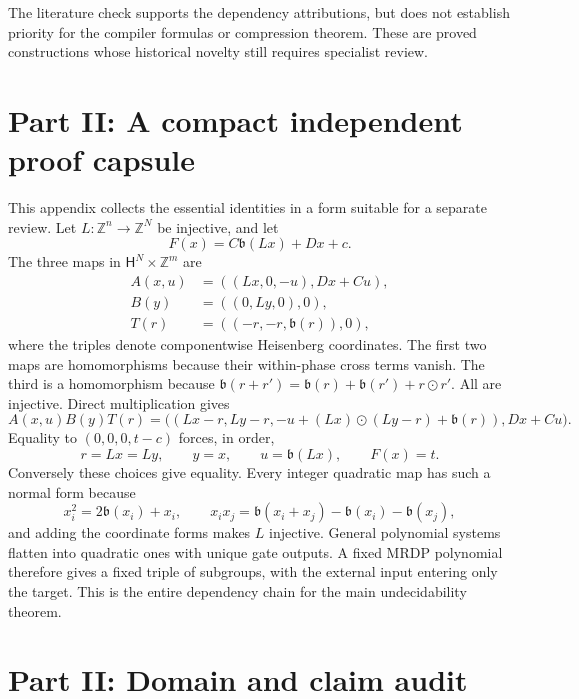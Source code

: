 \documentclass[11pt,letterpaper]{article}
\theoremstyle{definition}
\theoremstyle{remark}
\newcommand{\ZZ}{\mathbb Z}
\newcommand{\HH}{\mathsf H}
\newcommand{\bn}{\mathfrak b}
\begin{document}
The literature check supports the dependency attributions, but does not establish priority for the compiler formulas or compression theorem. These are proved constructions whose historical novelty still requires specialist review.

\section{Part II: A compact independent proof capsule}
\label{gts:tp:app:capsule}

This appendix collects the essential identities in a form suitable for a
separate review. Let $L:\ZZ^n\to\ZZ^N$ be injective, and let
\[
                      F(x)=C\bn(Lx)+Dx+c.
\]
The three maps in $\HH^N\times\ZZ^m$ are
\begin{align*}
 A(x,u)&=((Lx,0,-u),Dx+Cu),\\
 B(y)&=((0,Ly,0),0),\\
 T(r)&=((-r,-r,\bn(r)),0),
\end{align*}
where the triples denote componentwise Heisenberg coordinates. The first
two maps are homomorphisms because their within-phase cross terms vanish.
The third is a homomorphism because
$\bn(r+r')=\bn(r)+\bn(r')+r\odot r'$. All are injective. Direct
multiplication gives
\[
 A(x,u)B(y)T(r)
   =\big((Lx-r,Ly-r,-u+(Lx)\odot(Ly-r)+\bn(r)),Dx+Cu\big).
\]
Equality to $(0,0,0,t-c)$ forces, in order,
\[
                  r=Lx=Ly,\qquad y=x,\qquad u=\bn(Lx),
                  \qquad F(x)=t.
\]
Conversely these choices give equality. Every integer quadratic map has
such a normal form because
\[
    x_i^2=2\bn(x_i)+x_i,\qquad
    x_ix_j=\bn(x_i+x_j)-\bn(x_i)-\bn(x_j),
\]
and adding the coordinate forms makes $L$ injective. General polynomial
systems flatten into quadratic ones with unique gate outputs. A fixed
MRDP polynomial therefore gives a fixed triple of subgroups, with the
external input entering only the target. This is the entire dependency
chain for the main undecidability theorem.

\section{Part II: Domain and claim audit}
\label{gts:tp:app:audit}
\end{document}
